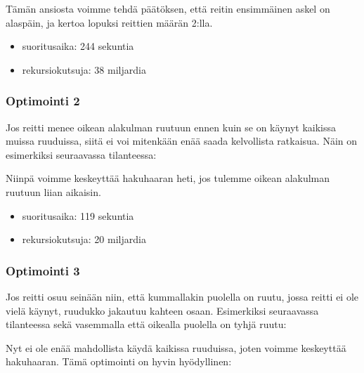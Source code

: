 Tämän ansiosta voimme tehdä päätöksen,
että reitin ensimmäinen askel on alaspäin,
ja kertoa lopuksi reittien määrän 2:lla.

\begin{itemize}
\item
suoritusaika: 244 sekuntia
\item
rekursiokutsuja: 38 miljardia
\end{itemize}

\subsubsection{Optimointi 2}

Jos reitti menee oikean alakulman ruutuun ennen kuin
se on käynyt kaikissa muissa ruuduissa,
siitä ei voi mitenkään enää saada kelvollista ratkaisua.
Näin on esimerkiksi seuraavassa tilanteessa:

\begin{center}
\end{center}
Niinpä voimme keskeyttää hakuhaaran heti,
jos tulemme oikean alakulman ruutuun liian aikaisin.
\begin{itemize}
\item
suoritusaika: 119 sekuntia
\item
rekursiokutsuja: 20 miljardia
\end{itemize}

\subsubsection{Optimointi 3}

Jos reitti osuu seinään niin, että kummallakin puolella
on ruutu, jossa reitti ei ole vielä käynyt,
ruudukko jakautuu kahteen osaan.
Esimerkiksi seuraavassa tilanteessa
sekä vasemmalla että
oikealla puolella on tyhjä ruutu:

\begin{center}
\end{center}
Nyt ei ole enää mahdollista käydä kaikissa ruuduissa,
joten voimme keskeyttää hakuhaaran.
Tämä optimointi on hyvin hyödyllinen:


